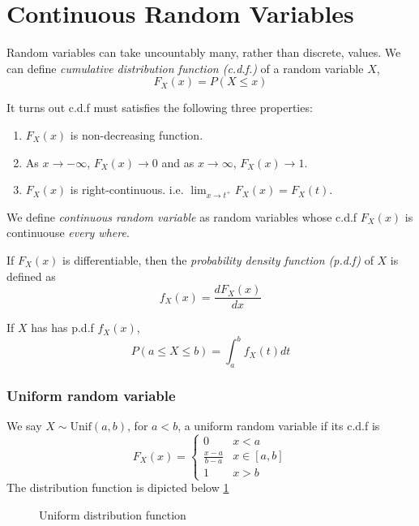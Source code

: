\section{Continuous Random Variables}
Random variables can take uncountably many, rather than discrete, values. We can define \textit{cumulative distribution function (c.d.f.)} of a random variable $X$,
$$F_X(x) = P(X \leq x)$$

It turns out c.d.f must satisfies the following three properties:
\begin{enumerate}
	\item $F_X(x)$ is non-decreasing function.
	\item As $x\to -\infty$, $F_X(x) \to 0$ and as $x \to \infty$, $F_X(x) \to 1$.
	\item $F_X(x)$ is right-continuous. i.e. $\lim_{x\to t^+} F_X(x) = F_X(t)$.
\end{enumerate}

We define \textit{continuous random variable} as random variables whose c.d.f $F_X(x)$ is continuouse \textit{every where}.

If $F_X(x)$ is differentiable, then the \textit{probability density function (p.d.f)} of $X$ is defined as
$$f_X(x) = \frac{dF_X(x)}{dx}$$

If $X$ has has p.d.f $f_X(x)$,
$$P(a\leq X \leq b) = \int_a^b f_X(t) dt$$

\subsubsection{Uniform random variable}
We say $X\sim \textrm{Unif} (a,b)$, for $a<b$, a uniform random variable if its c.d.f is 
$$F_X(x) = \begin{cases}
	0 & x < a\\
	\frac{x-a}{b-a} &  x \in [a,b] \\
	1 & x > b
\end{cases} $$
The distribution function is dipicted below \ref{fig:uniform}
\begin{figure}[h]
	\centering
	\caption{Uniform distribution function}
	\label{fig:uniform}
\end{figure}

